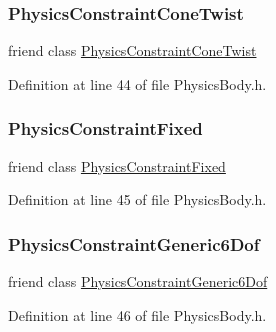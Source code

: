 \subsubsection{\texorpdfstring{Physics\+Constraint\+Cone\+Twist}{PhysicsConstraintConeTwist}}
{\footnotesize\ttfamily friend class \mbox{\hyperlink{classnjli_1_1_physics_constraint_cone_twist}{Physics\+Constraint\+Cone\+Twist}}\hspace{0.3cm}{\ttfamily [friend]}}



Definition at line 44 of file Physics\+Body.\+h.

\mbox{\label{classnjli_1_1_physics_body_a684f5ece6d7d44c2b9f689e76458a8fb}} 
\subsubsection{\texorpdfstring{Physics\+Constraint\+Fixed}{PhysicsConstraintFixed}}
{\footnotesize\ttfamily friend class \mbox{\hyperlink{classnjli_1_1_physics_constraint_fixed}{Physics\+Constraint\+Fixed}}\hspace{0.3cm}{\ttfamily [friend]}}



Definition at line 45 of file Physics\+Body.\+h.

\mbox{\label{classnjli_1_1_physics_body_a1d2185bf07a23cc48cd8f9d4271f3e39}} 
\subsubsection{\texorpdfstring{Physics\+Constraint\+Generic6\+Dof}{PhysicsConstraintGeneric6Dof}}
{\footnotesize\ttfamily friend class \mbox{\hyperlink{classnjli_1_1_physics_constraint_generic6_dof}{Physics\+Constraint\+Generic6\+Dof}}\hspace{0.3cm}{\ttfamily [friend]}}



Definition at line 46 of file Physics\+Body.\+h.

